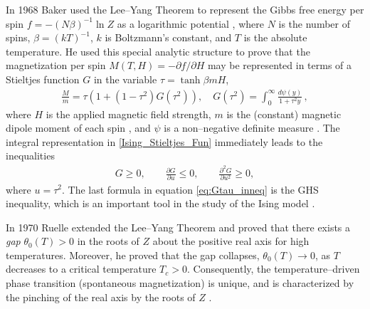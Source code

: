 \documentclass[english,12pt,jmp,graphicx]{revtex4-1}
\begin{document}
In 1968 Baker \cite{Baker:PRL-990} used the Lee--Yang Theorem to represent the Gibbs
free energy per spin $f=-(N\beta)^{-1}\ln{Z}$ as a logarithmic potential
\cite{Saff_Totik:97}, where $N$ is the number of spins, $\beta=(kT)^{-1}$,
$k$ is Boltzmann's constant, and $T$ is the absolute temperature.
He used this special analytic structure to prove
that the magnetization per spin $M(T,H)=-\partial f/\partial H$
\cite{Robertson-1993} may be represented in terms of a Stieltjes
function $G$ in the variable $\tau=\tanh{\beta mH}$,          
%
\begin{align}\label{Ising_Stieltjes_Fun}
  \frac{M}{m} =\tau(1+(1-\tau^2)G(\tau^2)), \quad
  G(\tau^2)=\int_0^\infty\frac{d\psi(y)}{1+\tau^2y}\,, %
\end{align}
%
where $H$ is the applied magnetic field strength, $m$ is the
(constant) magnetic dipole moment of each spin \cite{Griffiths-1999},
and $\psi$ is a non--negative definite measure
\cite{Baker:PRL-990,Baker-1990}. The integral representation in
\eqref{Ising_Stieltjes_Fun} immediately leads to the inequalities    
%
\begin{align}\label{eq:Gtau_inneq}
  G\geq0, \qquad \frac{\partial G}{\partial u}\leq0, \qquad \frac{\partial^2G}{\partial u^2}\geq0,
\end{align}
%
where $u=\tau^2$. The last formula in equation \eqref{eq:Gtau_inneq} is
the GHS inequality, which is an important tool in the study of the
Ising model \cite{Golden:JMP-5627}. 

In 1970 Ruelle  \cite{Ruelle:PRL:303} extended the Lee--Yang Theorem and proved that
there exists a \emph{gap} $\theta_0(T)>0$ in the roots of $Z$ about the positive
real axis for high temperatures. Moreover, he
proved that the gap collapses, $\theta_0(T)\to0$, as $T$ decreases to a
critical temperature $T_c>0$. Consequently, the temperature--driven
phase transition (spontaneous magnetization) is unique, and is
characterized by the pinching of the real axis by the roots of $Z$
\cite{Ruelle-1969}.   
\end{document}
